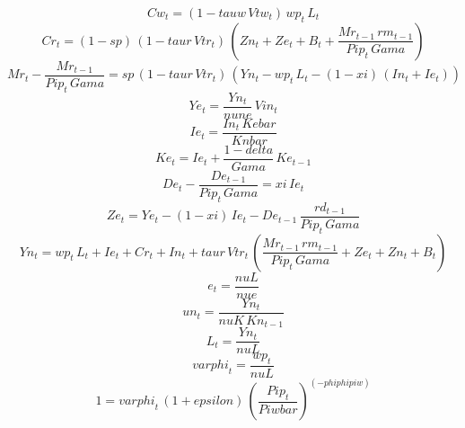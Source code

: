 \begin{dmath}
{Cw}_{t}=\left(1-{tauw}\, {Vtw}_{t}\right)\, {wp}_{t}\, {L}_{t}
\end{dmath}
\begin{dmath}
{Cr}_{t}=\left(1-{sp}\right)\, \left(1-{taur}\, {Vtr}_{t}\right)\, \left({Zn}_{t}+{Ze}_{t}+{B}_{t}+\frac{{Mr}_{t-1}\, {rm}_{t-1}}{{Pip}_{t}\, {Gama}}\right)
\end{dmath}
\begin{dmath}
{Mr}_{t}-\frac{{Mr}_{t-1}}{{Pip}_{t}\, {Gama}}={sp}\, \left(1-{taur}\, {Vtr}_{t}\right)\, \left({Yn}_{t}-{wp}_{t}\, {L}_{t}-\left(1-{xi}\right)\, \left({In}_{t}+{Ie}_{t}\right)\right)
\end{dmath}
\begin{dmath}
{Ye}_{t}=\frac{{Yn}_{t}}{{nune}}\, {Vin}_{t}
\end{dmath}
\begin{dmath}
{Ie}_{t}=\frac{{In}_{t}\, {Kebar}}{{Knbar}}
\end{dmath}
\begin{dmath}
{Ke}_{t}={Ie}_{t}+\frac{1-{delta}}{{Gama}}\, {Ke}_{t-1}
\end{dmath}
\begin{dmath}
{De}_{t}-\frac{{De}_{t-1}}{{Pip}_{t}\, {Gama}}={xi}\, {Ie}_{t}
\end{dmath}
\begin{dmath}
{Ze}_{t}={Ye}_{t}-\left(1-{xi}\right)\, {Ie}_{t}-{De}_{t-1}\, \frac{{rd}_{t-1}}{{Pip}_{t}\, {Gama}}
\end{dmath}
\begin{dmath}
{Yn}_{t}={wp}_{t}\, {L}_{t}+{Ie}_{t}+{Cr}_{t}+{In}_{t}+{taur}\, {Vtr}_{t}\, \left(\frac{{Mr}_{t-1}\, {rm}_{t-1}}{{Pip}_{t}\, {Gama}}+{Ze}_{t}+{Zn}_{t}+{B}_{t}\right)
\end{dmath}
\begin{dmath}
{e}_{t}=\frac{{nuL}}{{nue}}
\end{dmath}
\begin{dmath}
{un}_{t}=\frac{{Yn}_{t}}{{nuK}\, {Kn}_{t-1}}
\end{dmath}
\begin{dmath}
{L}_{t}=\frac{{Yn}_{t}}{{nuL}}
\end{dmath}
\begin{dmath}
{varphi}_{t}=\frac{{wp}_{t}}{{nuL}}
\end{dmath}
\begin{dmath}
1={varphi}_{t}\, \left(1+{epsilon}\right)\, \left(\frac{{Pip}_{t}}{{Piwbar}}\right)^{\left(-{phiphipiw}\right)}
\end{dmath}
